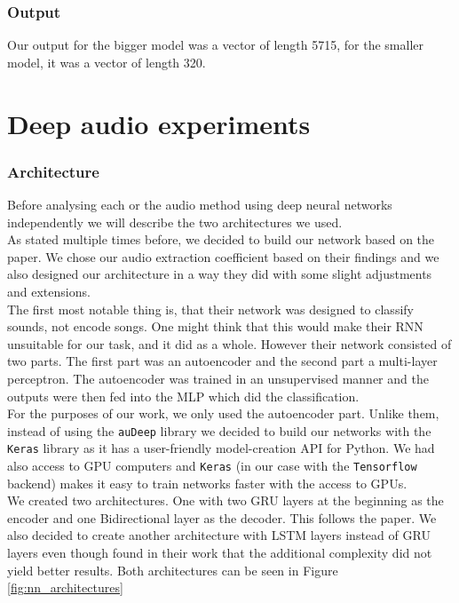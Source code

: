 \subsubsection{Output}
Our output for the bigger model was a vector of length 5715, for the smaller model, it was a vector of length 320.


\section{Deep audio experiments}

\subsubsection{Architecture}
Before analysing each or the audio method using deep neural networks independently we will describe the two architectures we used. \\
As stated multiple times before, we decided to build our network based on the \cite{inproceedings_RNNs} paper. We chose our audio extraction coefficient based on their findings and we also designed our architecture in a way they did with some slight adjustments and extensions. \\
The first most notable thing is, that their network was designed to classify sounds, not encode songs. One might think that this would make their RNN unsuitable for our task, and it did as a whole. However their network consisted of two parts. The first part was an autoencoder and the second part a multi-layer perceptron. The autoencoder was trained in an unsupervised manner and the outputs were then fed into the MLP which did the classification. \\
For the purposes of our work, we only used the autoencoder part. Unlike them, instead of using the \texttt{auDeep} library we decided to build our networks with the \texttt{Keras} library \cite{chollet2015keras} as it has a user-friendly model-creation API for Python. We had also access to GPU computers and \texttt{Keras} (in our case with the \texttt{Tensorflow} backend) makes it easy to train networks faster with the access to GPUs. \\
We created two architectures. One with two GRU layers at the beginning as the encoder and one Bidirectional layer as the decoder. This follows the paper. We also decided to create another architecture with LSTM layers instead of GRU layers even though \citeauthor{inproceedings_RNNs} found in their work that the additional complexity did not yield better results. Both architectures can be seen in Figure \ref{fig:nn_architectures} \\


